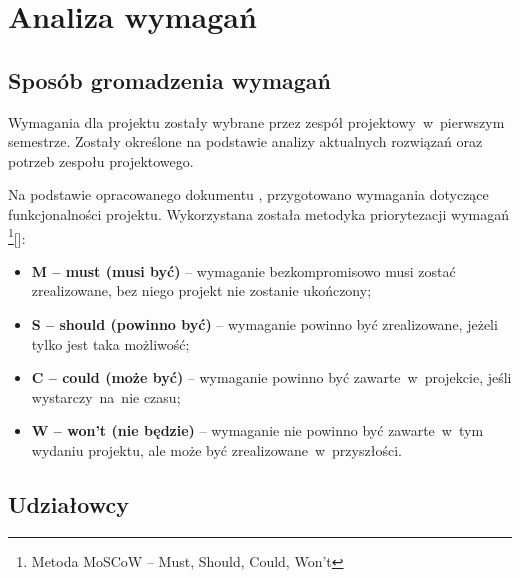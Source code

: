 \newgeometry{} %

\chapter{Analiza wymagań}
\label{ch:analiza-wymagan}

\section{Sposób gromadzenia wymagań}
\label{sec:sposob-gromadzenia-wymagan}

Wymagania dla projektu zostały wybrane przez zespół projektowy~w~pierwszym semestrze. Zostały określone na podstawie analizy aktualnych rozwiązań oraz potrzeb zespołu projektowego.

Na podstawie opracowanego dokumentu , przygotowano wymagania dotyczące funkcjonalności projektu. \newline Wykorzystana została metodyka priorytezacji wymagań \footnote{Metoda MoSCoW – Must, Should, Could, Won't}[]:
\begin{itemize}
    \item \textbf{M – must (musi być)} – wymaganie bezkompromisowo musi zostać zrealizowane, bez niego projekt nie zostanie ukończony;
    \item \textbf{S – should (powinno być)} – wymaganie powinno być zrealizowane, jeżeli tylko jest taka możliwość;
    \item \textbf{C – could (może być)} – wymaganie powinno być zawarte~w~projekcie, jeśli wystarczy~na~nie czasu;
    \item \textbf{W – won't (nie będzie)} – wymaganie nie powinno być zawarte~w~tym wydaniu projektu, ale może być zrealizowane~w~przyszłości.
\end{itemize}


\section{Udziałowcy}
\label{sec:udzialowcy}

\begin{stakeholder}[label={tab:stakeholder:someholder1},caption={opis udzialowca}]
\end{stakeholder}


